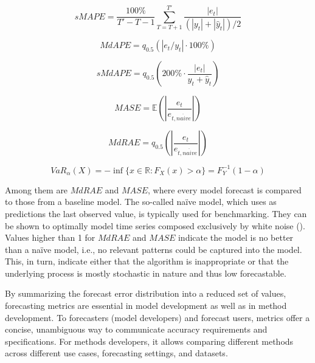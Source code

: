 \begin{equation}\label{eq:smape}
    sMAPE = \frac{100\%}{T'-T-1}\sum^{T'}_{T=T+1} \frac{|e_t|}{(|y_{t}|+|\hat{y}_{t}|)/2}
\end{equation}

\begin{equation}\label{eq:mdape}
    MdAPE = q_{0.5}(|e_t/y_t|\cdot 100\%)
\end{equation}

\begin{equation}\label{eq:smdape}
    sMdAPE = q_{0.5}\left(200\% \cdot \frac{|e_t|}{y_{t}+\hat{y}_{t}}\right)
\end{equation}

\begin{equation}\label{eq:mase}
    MASE = \mathbb{E}\left(\left|\frac{e_t}{e_{t, na\ddot{i}ve}}\right|\right)
\end{equation}

\begin{equation}\label{eq:mdrae}
    MdRAE = q_{0.5}\left(\left|\frac{e_t}{e_{t, na\ddot{i}ve}} \right|\right)
\end{equation}

\begin{equation}\label{eq:VaR}
    VaR_\alpha(X)=-\inf\big\{x\in\mathbb{R}:F_X(x)>\alpha\big\} = F^{-1}_Y(1-\alpha)
\end{equation}

Among them are $MdRAE$ and $MASE$, where every model forecast is compared to those from a baseline model.
The so-called naïve model, which uses as predictions the last observed value, is typically used for benchmarking.
They can be shown to optimally model time series composed exclusively by white noise (\cite{hyndman2006metrics}).
Values higher than 1 for $MdRAE$ and $MASE$ indicate the model is no better than a naïve model, i.e., no relevant patterns could be captured into the model.
This, in turn, indicate either that the algorithm is inappropriate or that the underlying process is mostly stochastic in nature and thus low forecastable.

By summarizing the forecast error distribution into a reduced set of values, forecasting metrics are essential in model development as well as in method development.
To forecasters (model developers) and forecast users, metrics offer a concise, unambiguous way to communicate accuracy requirements and specifications. For methods developers, it allows comparing different methods across different use cases, forecasting settings, and datasets.

